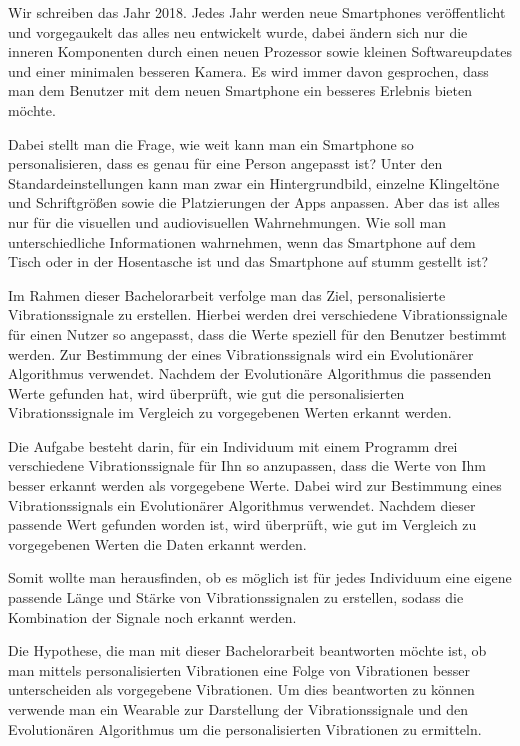 
Wir schreiben das Jahr 2018. 
Jedes Jahr werden neue Smartphones ver{\"o}ffentlicht und vorgegaukelt das alles neu entwickelt wurde, dabei {\"a}ndern sich nur die inneren Komponenten durch einen neuen Prozessor sowie kleinen Softwareupdates und einer minimalen besseren Kamera. 
Es wird immer davon gesprochen, dass man dem Benutzer mit dem neuen Smartphone ein besseres Erlebnis bieten m{\"o}chte. 

Dabei stellt man die Frage, wie weit kann man ein Smartphone so personalisieren, dass es genau f{\"u}r eine Person angepasst ist? 
Unter den Standardeinstellungen kann man zwar ein Hintergrundbild, einzelne Klingelt{\"o}ne und Schriftgr{\"o}{\ss}en sowie die Platzierungen der Apps anpassen. 
Aber das ist alles nur f{\"u}r die visuellen und audiovisuellen Wahrnehmungen. 
Wie soll man unterschiedliche Informationen wahrnehmen, wenn das Smartphone auf dem Tisch oder in der Hosentasche ist und das Smartphone auf stumm gestellt ist? 

Im Rahmen dieser Bachelorarbeit verfolge man das Ziel, personalisierte Vibrationssignale zu erstellen.
Hierbei werden drei verschiedene Vibrationssignale f{\"u}r einen Nutzer so angepasst, dass die Werte speziell f{\"u}r den Benutzer bestimmt werden. 
Zur Bestimmung der eines Vibrationssignals wird ein Evolution{\"a}rer Algorithmus verwendet. Nachdem der Evolution{\"a}re Algorithmus die passenden Werte gefunden hat, wird {\"u}berpr{\"u}ft, wie gut die personalisierten Vibrationssignale im Vergleich zu vorgegebenen Werten erkannt werden. 

Die Aufgabe besteht darin, f{\"u}r ein Individuum mit einem Programm drei verschiedene Vibrationssignale f{\"u}r Ihn so anzupassen, dass die Werte von Ihm besser erkannt werden als vorgegebene Werte. Dabei wird zur Bestimmung eines Vibrationssignals ein Evolution{\"a}rer Algorithmus verwendet. Nachdem dieser passende Wert gefunden worden ist, wird {\"u}berpr{\"u}ft, wie gut im Vergleich zu vorgegebenen Werten die Daten erkannt werden.

Somit wollte man herausfinden, ob es m{\"o}glich ist f{\"u}r jedes Individuum eine eigene passende L{\"a}nge und St{\"a}rke von Vibrationssignalen zu erstellen, sodass die Kombination der Signale noch erkannt werden.

Die Hypothese, die man mit dieser Bachelorarbeit beantworten m{\"o}chte ist, ob man mittels personalisierten Vibrationen eine Folge von Vibrationen besser unterscheiden als vorgegebene Vibrationen.
Um dies beantworten zu k{\"o}nnen verwende man ein Wearable zur Darstellung der Vibrationssignale und den Evolution{\"a}ren Algorithmus um die personalisierten Vibrationen zu ermitteln.
